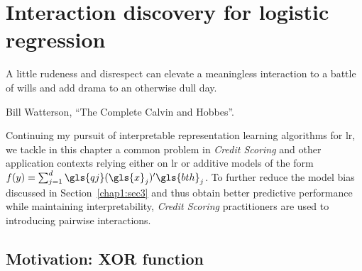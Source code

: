 \chapter{Interaction discovery for logistic regression} \label{chap5}


\epigraph{A little rudeness and disrespect can elevate a meaningless interaction to a battle of wills and add drama to an otherwise dull day.}{Bill Watterson, ``The Complete Calvin and Hobbes''.}

\minitoc


\bigskip

Continuing my pursuit of interpretable representation learning algorithms for \gls{lr}, we tackle in this chapter a common problem in \textit{Credit Scoring} and other application contexts relying either on \gls{lr} or additive models of the form $f(y) = \sum_{j=1}^d \gls{qj}(\gls{x}_j)' \gls{bth}_j$. To further reduce the model bias discussed in Section~\ref{chap1:sec3} and thus obtain better predictive performance while maintaining interpretability, \textit{Credit Scoring} practitioners are used to introducing pairwise interactions.


\section{Motivation: XOR function}

